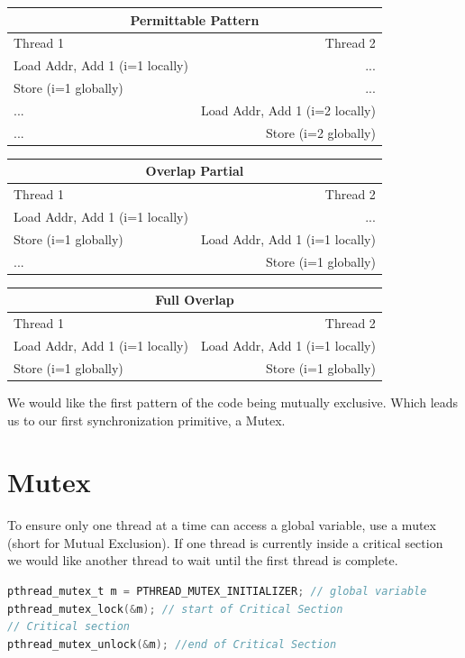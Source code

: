 \begin{tabular}{ l | r }
  \multicolumn{2}{c}{Permittable Pattern}  \\ \hline
  Thread 1 & Thread 2 \\ \hline
  Load Addr, Add 1 (i=1 locally) & ...  \\
  Store (i=1 globally) & ...  \\
  ... & Load Addr, Add 1 (i=2 locally)  \\
  ... & Store (i=2 globally)  \\
\end{tabular}

\begin{tabular}{ l | r }
\multicolumn{2}{c}{Overlap Partial} \\ \hline
Thread 1 & Thread 2 \\ \hline
Load Addr, Add 1 (i=1 locally) & ... \\
Store (i=1 globally) & Load Addr, Add 1 (i=1 locally) \\
... & Store (i=1 globally) \\
\end{tabular}

\begin{tabular}{ l | r }
\multicolumn{2}{c}{Full Overlap} \\ \hline
Thread 1 & Thread 2 \\ \hline
Load Addr, Add 1 (i=1 locally) & Load Addr, Add 1 (i=1 locally) \\
Store (i=1 globally) & Store (i=1 globally) \\
\end{tabular}

We would like the first pattern of the code being mutually exclusive. Which leads us to our first synchronization primitive, a Mutex.

\section{Mutex}

To ensure only one thread at a time can access a global variable, use a mutex (short for Mutual Exclusion). If one thread is currently inside a critical section we would like another thread to wait until the first thread is complete.

\begin{lstlisting}[language=C]
pthread_mutex_t m = PTHREAD_MUTEX_INITIALIZER; // global variable
pthread_mutex_lock(&m); // start of Critical Section
// Critical section
pthread_mutex_unlock(&m); //end of Critical Section
\end{lstlisting}

